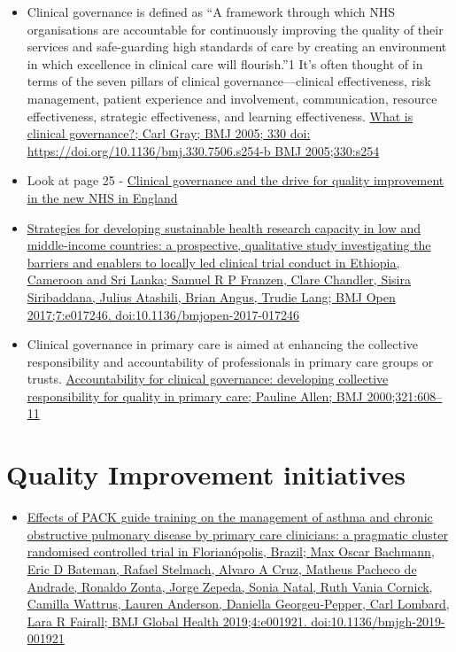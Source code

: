 \documentclass[]{book}
\providecommand{\tightlist}{%
  \setlength{\itemsep}{0pt}\setlength{\parskip}{0pt}}
\begin{document}
\begin{itemize}
\item
  Clinical governance is defined as ``A framework through which NHS organisations are accountable for continuously improving the quality of their services and safe-guarding high standards of care by creating an environment in which excellence in clinical care will flourish.''1 It's often thought of in terms of the seven pillars of clinical governance---clinical effectiveness, risk management, patient experience and involvement, communication, resource effectiveness, strategic effectiveness, and learning effectiveness. \href{https://www.bmj.com/content/330/7506/s254.3}{What is clinical governance?; Carl Gray; BMJ 2005; 330 doi: https://doi.org/10.1136/bmj.330.7506.s254-b BMJ 2005;330:s254}
\item
  Look at page 25 - \href{https://www.ncbi.nlm.nih.gov/pmc/articles/PMC1113460/pdf/61.pdf}{Clinical governance and the drive for quality improvement in the new NHS in England}
\item
  \href{https://bmjopen.bmj.com/content/bmjopen/7/10/e017246.full.pdf}{Strategies for developing sustainable health research capacity in low and middle-income countries: a prospective, qualitative study investigating the barriers and enablers to locally led clinical trial conduct in Ethiopia, Cameroon and Sri Lanka; Samuel R P Franzen, Clare Chandler, Sisira Siribaddana, Julius Atashili, Brian Angus, Trudie Lang; BMJ Open 2017;7:e017246. doi:10.1136/bmjopen-2017-017246}
\item
  Clinical governance in primary care is aimed at enhancing the collective responsibility and accountability of professionals in primary care groups or trusts. \href{https://www.who.int/management/partnerships/accountability/ClinicalGovernancePHCAccountability.pdf}{Accountability for clinical governance: developing collective responsibility for quality in primary care; Pauline Allen; BMJ 2000;321:608--11}
\end{itemize}

\hypertarget{quality-improvement-initiatives}{%
\section*{Quality Improvement initiatives}\label{quality-improvement-initiatives}}

\begin{itemize}
\tightlist
\item
  \href{file:///C:/Users/Adelson/Downloads/e001921.full.pdf}{Effects of PACK guide training on the management of asthma and chronic obstructive pulmonary disease by primary care clinicians: a pragmatic cluster randomised controlled trial in Florianópolis, Brazil; Max Oscar Bachmann, Eric D Bateman, Rafael Stelmach, Alvaro A Cruz, Matheus Pacheco de Andrade, Ronaldo Zonta, Jorge Zepeda, Sonia Natal, Ruth Vania Cornick, Camilla Wattrus, Lauren Anderson, Daniella Georgeu-Pepper, Carl Lombard, Lara R Fairall; BMJ Global Health 2019;4:e001921. doi:10.1136/bmjgh-2019-001921}
\end{itemize}
\end{document}
